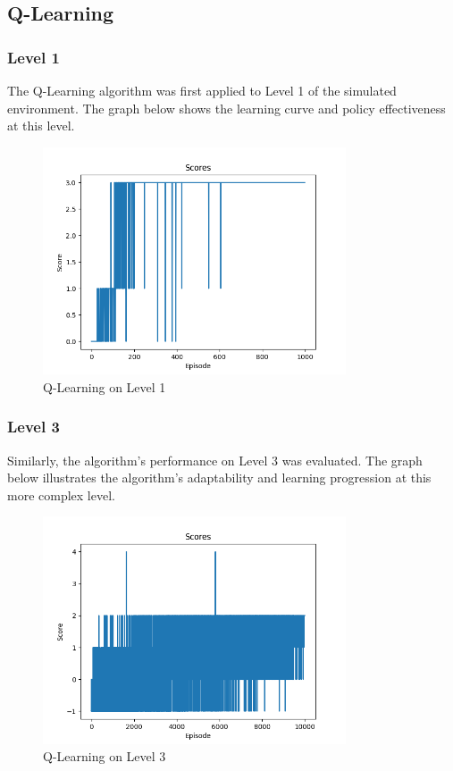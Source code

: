 \documentclass{article}
\begin{document}
\subsection{Q-Learning}

\newpage
\subsubsection{Level 1}
The Q-Learning algorithm was first applied to Level 1 of the simulated environment. 
The graph below shows the learning curve and policy effectiveness at this level.

\begin{figure}[h]
\centering
\includegraphics[width=0.8\textwidth]{level1.png}
\caption{Q-Learning on Level 1}
\end{figure}

\subsubsection{Level 3}
Similarly, the algorithm's performance on Level 3 was evaluated. 
The graph below illustrates the algorithm's adaptability and learning progression at this more complex level.

\begin{figure}[h]
\centering
\includegraphics[width=0.8\textwidth]{level3.png}
\caption{Q-Learning on Level 3}
\end{figure}
\end{document}
